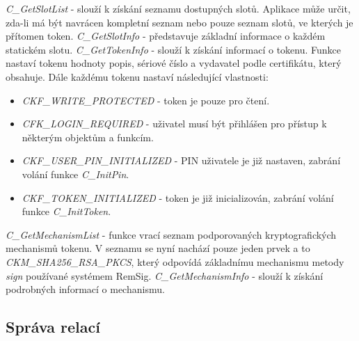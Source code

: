 \documentclass[]{fithesis3}
\begin{document}
	\textit{C\_GetSlotList} - slouží k získání seznamu dostupných slotů. Aplikace může 				určit, zda-li má být navrácen kompletní seznam nebo pouze seznam slotů, ve kterých je 			přítomen token.
	\newline
	\newline
	\textit{C\_GetSlotInfo} - představuje základní informace o každém statickém slotu.
	\newline
	\newline
	\textit{C\_GetTokenInfo} - slouží k získání informací o tokenu. Funkce nastaví tokenu 				hodnoty popis, sériové číslo a vydavatel podle certifikátu, který obsahuje. Dále každému 			tokenu nastaví následující vlastnosti:
		\begin{itemize}
		\item \textit{CKF\_WRITE\_PROTECTED} - token je pouze pro čtení.

		\item \textit{CFK\_LOGIN\_REQUIRED} - uživatel musí být přihlášen pro přístup k 				některým objektům a funkcím.

		\item \textit{CKF\_USER\_PIN\_INITIALIZED} - PIN uživatele je již nastaven, zabrání 				volání funkce \textit{C\_InitPin}.

		\item \textit{CKF\_TOKEN\_INITIALIZED} - token je již inicializován, zabrání volání funkce 			\textit{C\_InitToken}.
		\end{itemize}
	\textit{C\_GetMechanismList} - funkce vrací seznam podporovaných kryptografických 				mechanismů tokenu. V seznamu se nyní nachází pouze jeden prvek a to 							\textit{CKM\_SHA256\_RSA\_PKCS}, který odpovídá základnímu mechanismu metody 			\textit{sign} používané systémem RemSig.
	\newline
	\newline
	\textit{C\_GetMechanismInfo} - slouží k získání podrobných informací o mechanismu.

	\subsection{Správa relací} 
\end{document}
